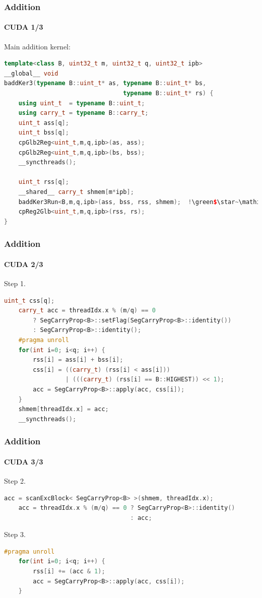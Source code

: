 \begin{frame}[fragile]
  \frametitle{Addition}
  \framesubtitle{CUDA 1/3}
  Main addition kernel:
\begin{lstlisting}[language=CPP,gobble=0,basicstyle=\scriptsize,escapeinside=!!,frame=single]
template<class B, uint32_t m, uint32_t q, uint32_t ipb>
__global__ void
baddKer3(typename B::uint_t* as, typename B::uint_t* bs,
                                 typename B::uint_t* rs) {
    using uint_t  = typename B::uint_t;
    using carry_t = typename B::carry_t;
    uint_t ass[q];
    uint_t bss[q];
    cpGlb2Reg<uint_t,m,q,ipb>(as, ass);
    cpGlb2Reg<uint_t,m,q,ipb>(bs, bss);
    __syncthreads();

    uint_t rss[q];
    __shared__ carry_t shmem[m*ipb];
    baddKer3Run<B,m,q,ipb>(ass, bss, rss, shmem);  !\green$\star~\mathit{badd}$!
    cpReg2Glb<uint_t,m,q,ipb>(rss, rs);
}
\end{lstlisting}
\end{frame}

\begin{frame}[fragile]
  \frametitle{Addition}
  \framesubtitle{CUDA 2/3}
  Step 1.
  \begin{lstlisting}[language=CPP,gobble=4,basicstyle=\scriptsize,firstnumber=18,frame=single]
    uint_t css[q];
    carry_t acc = threadIdx.x % (m/q) == 0
        ? SegCarryProp<B>::setFlag(SegCarryProp<B>::identity())
        : SegCarryProp<B>::identity();
    #pragma unroll
    for(int i=0; i<q; i++) {
        rss[i] = ass[i] + bss[i];
        css[i] = ((carry_t) (rss[i] < ass[i]))
                 | (((carry_t) (rss[i] == B::HIGHEST)) << 1);
        acc = SegCarryProp<B>::apply(acc, css[i]);
    }
    shmem[threadIdx.x] = acc;
    __syncthreads();
\end{lstlisting}
\end{frame}

\begin{frame}[fragile]
  \frametitle{Addition}
  \framesubtitle{CUDA 3/3}
  Step 2.
  \begin{lstlisting}[language=CPP,gobble=4,basicstyle=\scriptsize,firstnumber=31,frame=single]
    acc = scanExcBlock< SegCarryProp<B> >(shmem, threadIdx.x);
    acc = threadIdx.x % (m/q) == 0 ? SegCarryProp<B>::identity()
                                   : acc;
\end{lstlisting}
  Step 3.
\begin{lstlisting}[language=CPP,gobble=4,basicstyle=\scriptsize,firstnumber=34,frame=single]
    #pragma unroll
    for(int i=0; i<q; i++) {
        rss[i] += (acc & 1);
        acc = SegCarryProp<B>::apply(acc, css[i]);
    }
\end{lstlisting}
\end{frame}

